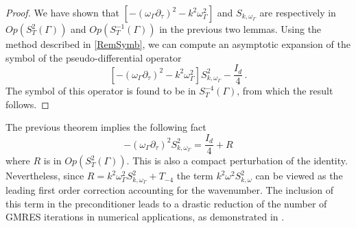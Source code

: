 \documentclass[a4paper]{article}
\begin{document}
\begin{proof}
	We have shown that $\left[-(\omega_\Gamma \partial_\tau)^2 - k^2\omega_\Gamma^2\right]$ and  $S_{k,\omega_\Gamma}$ are respectively in $\textit{Op}(S^{2}_T(\Gamma))$ and $\textit{Op}(S^{-1}_T(\Gamma))$ in the previous two lemmas. Using the method described in \autoref{RemSymb}, we can compute an asymptotic expansion of the symbol of the pseudo-differential operator \[\left[-(\omega_\Gamma \partial_\tau)^2 - k^2\omega_\Gamma^2\right]S_{k,\omega_\Gamma}^2 - \frac{I_d}{4}\,.\] 
	The symbol of this operator is found to be in $S^{-4}_T(\Gamma)$, from which the result follows.  
\end{proof}
\begin{Rem}
	The previous theorem implies the following fact
	\[-(\omega_\Gamma \partial_\tau)^2 S_{k,\omega_\Gamma}^2 = \frac{I_d}{4} + R\]
	where $R$ is in $\textit{Op}(S^2_T(\Gamma))$. This is also a compact perturbation of the identity. Nevertheless, since $R = k^2 \omega_\Gamma^2 S_{k,\omega_\Gamma}^2 + T_{-4}$ the term $k^2 \omega^2S_{k,\omega}^2$ can be viewed as the leading first order correction accounting for the wavenumber. The inclusion of this term in the preconditioner leads to a drastic reduction of the number of GMRES iterations in numerical applications, as demonstrated in \cite{alouges2018new}. 
\end{Rem}
\end{document}
